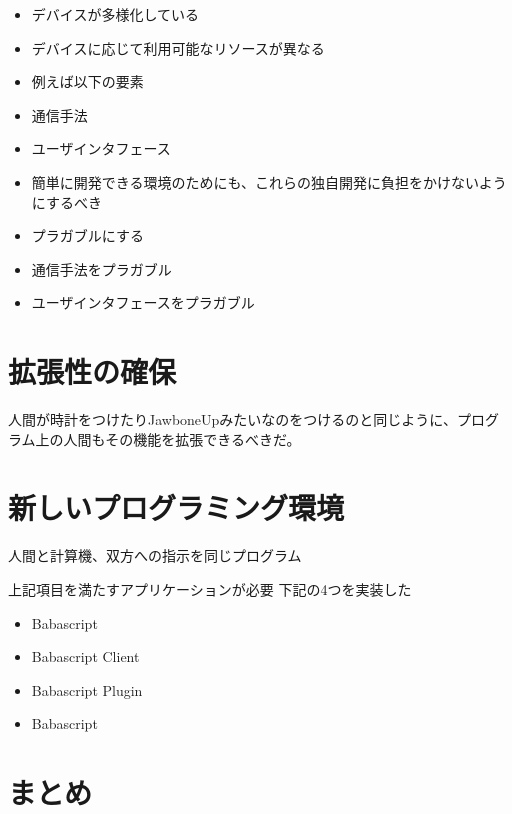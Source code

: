 \begin{itemize}
\item
  デバイスが多様化している
\item
  デバイスに応じて利用可能なリソースが異なる
\item
  例えば以下の要素
\item
  通信手法
\item
  ユーザインタフェース
\item
  簡単に開発できる環境のためにも、これらの独自開発に負担をかけないようにするべき
\item
  プラガブルにする
\item
  通信手法をプラガブル
\item
  ユーザインタフェースをプラガブル
\end{itemize}

\section{拡張性の確保}\label{ux62e1ux5f35ux6027ux306eux78baux4fdd}

人間が時計をつけたりJawboneUpみたいなのをつけるのと同じように、プログラム上の人間もその機能を拡張できるべきだ。

\section{新しいプログラミング環境}\label{ux65b0ux3057ux3044ux30d7ux30edux30b0ux30e9ux30dfux30f3ux30b0ux74b0ux5883}

人間と計算機、双方への指示を同じプログラム

上記項目を満たすアプリケーションが必要 下記の4つを実装した

\begin{itemize}
\itemsep1pt\parskip0pt
\item
  Babascript
\item
  Babascript Client
\item
  Babascript Plugin
\item
  Babascript
\end{itemize}

\section{まとめ}\label{ux307eux3068ux3081}
